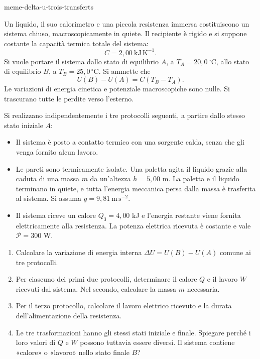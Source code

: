 \begin{exo}{meme-delta-u-trois-transferts}

Un liquido, il suo calorimetro e una piccola resistenza immersa costituiscono
un sistema chiuso, macroscopicamente in quiete. Il recipiente è rigido e si
suppone costante la capacità termica totale del sistema:
\[C=2{,}00\ \mathrm{kJ\,K^{-1}}.\]
Si vuole portare il sistema dallo stato di equilibrio $A$, a
$T_A=20{,}0\,^\circ\mathrm{C}$, allo stato di equilibrio $B$, a
$T_B=25{,}0\,^\circ\mathrm{C}$. Si ammette che
\[U(B)-U(A)=C(T_B-T_A).\]
Le variazioni di energia cinetica e potenziale macroscopiche sono nulle. Si
trascurano tutte le perdite verso l'esterno.

Si realizzano indipendentemente i tre protocolli seguenti, a partire dallo
stesso stato iniziale $A$:
\begin{itemize}
\item[Protocollo 1] Il sistema è posto a contatto termico con una sorgente calda, senza che gli venga fornito alcun lavoro.
\item[Protocollo 2] Le pareti sono termicamente isolate. Una paletta agita il liquido grazie alla caduta di una massa $m$ da un'altezza $h=5{,}00$ m. La paletta e il liquido terminano in quiete, e tutta l'energia meccanica persa dalla massa è trasferita al sistema. Si assuma $g=9{,}81\ \mathrm{m\,s^{-2}}$.
\item[Protocollo 3] Il sistema riceve un calore $Q_3=4{,}00$ kJ e l'energia restante viene fornita elettricamente alla resistenza. La potenza elettrica ricevuta è costante e vale $\mathcal P=300$ W.
\end{itemize}

\begin{enumerate}
\item Calcolare la variazione di energia interna $\Delta U=U(B)-U(A)$ comune ai tre protocolli.
\item Per ciascuno dei primi due protocolli, determinare il calore $Q$ e il lavoro $W$ ricevuti dal sistema. Nel secondo, calcolare la massa $m$ necessaria.
\item Per il terzo protocollo, calcolare il lavoro elettrico ricevuto e la durata dell'alimentazione della resistenza.
\item Le tre trasformazioni hanno gli stessi stati iniziale e finale. Spiegare perché i loro valori di $Q$ e $W$ possono tuttavia essere diversi. Il sistema contiene «calore» o «lavoro» nello stato finale $B$?
\end{enumerate}


\end{exo}
